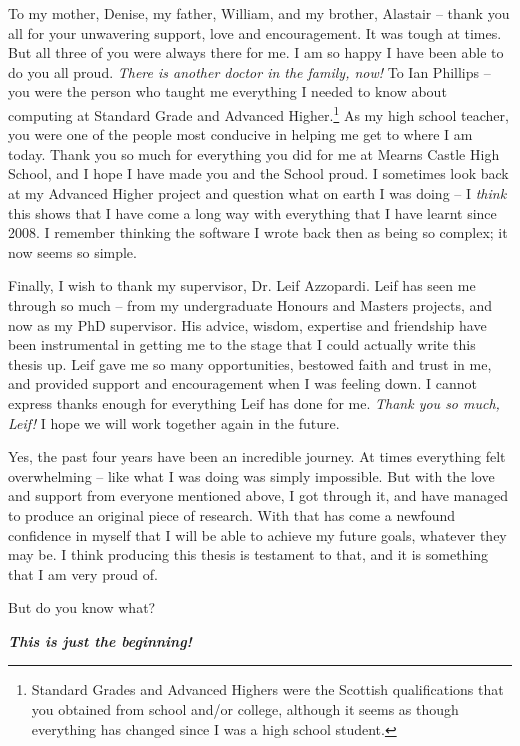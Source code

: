 \begin{preamble}
To my mother, Denise, my father, William, and my brother, Alastair -- thank you all for your unwavering support, love and encouragement. It was tough at times. But all three of you were always there for me. I am so happy I have been able to do you all proud. \emph{There is another doctor in the family, now!} To Ian Phillips -- you were the person who taught me everything I needed to know about computing at Standard Grade and Advanced Higher.\footnote{Standard Grades and Advanced Highers were the Scottish qualifications that you obtained from school and/or college, although it seems as though everything has changed since I was a high school student.} As my high school teacher, you were one of the people most conducive in helping me get to where I am today. Thank you so much for everything you did for me at Mearns Castle High School, and I hope I have made you and the School proud. I sometimes look back at my Advanced Higher project and question what on earth I was doing -- I \emph{think} this shows that I have come a long way with everything that I have learnt since 2008. I remember thinking the software I wrote back then as being so complex; it now seems so simple.

Finally, I wish to thank my supervisor, Dr. Leif Azzopardi. Leif has seen me through so much -- from my undergraduate Honours and Masters projects, and now as my PhD supervisor. His advice, wisdom, expertise and friendship have been instrumental in getting me to the stage that I could actually write this thesis up. Leif gave me so many opportunities, bestowed faith and trust in me, and provided support and encouragement when I was feeling down. I cannot express thanks enough for everything Leif has done for me. \emph{Thank you so much, Leif!} I hope we will work together again in the future.

Yes, the past four years have been an incredible journey. At times everything felt overwhelming -- like what I was doing was simply impossible. But with the love and support from everyone mentioned above, I got through it, and have managed to produce an original piece of research. With that has come a newfound confidence in myself that I will be able to achieve my future goals, whatever they may be. I think producing this thesis is testament to that, and it is something that I am very proud of.

But do you know what?

\textbf{\emph{This is just the beginning!}}

\end{preamble}


